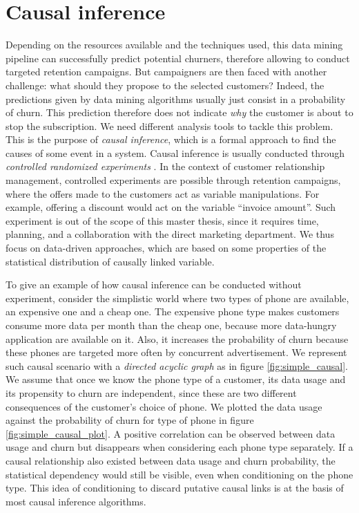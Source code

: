 \section{Causal inference}

Depending on the resources available and the techniques used, this data mining
pipeline can successfully predict potential churners, therefore allowing to
conduct targeted retention campaigns. But campaigners are then faced with
another challenge: what should they propose to the selected customers? Indeed,
the predictions given by data mining algorithms usually just consist in a
probability of churn. This prediction therefore does not indicate \emph{why} the
customer is about to stop the subscription. We need different analysis tools to
tackle this problem. This is the purpose of \emph{causal inference}, which is a
formal approach to find the causes of some event in a system. Causal inference
is usually conducted through \emph{controlled randomized experiments}
\parencite{fisher1937design}. In the context of customer relationship
management, controlled experiments are possible through retention campaigns,
where the offers made to the customers act as variable manipulations. For
example, offering a discount would act on the variable ``invoice amount''. Such
experiment is out of the scope of this master thesis, since it requires time,
planning, and a collaboration with the direct marketing department. We thus
focus on data-driven approaches, which are based on some properties of the
statistical distribution of causally linked variable.

To give an example of how causal inference can be conducted without experiment,
consider the simplistic world where two types of phone are available, an
expensive one and a cheap one. The expensive phone type makes customers consume
more data per month than the cheap one, because more data-hungry application are
available on it. Also, it increases the probability of churn because these
phones are targeted more often by concurrent advertisement. We represent such
causal scenario with a \emph{directed acyclic graph} as in figure
\ref{fig:simple_causal}. We assume that once we know the phone type of a
customer, its data usage and its propensity to churn are independent, since
these are two different consequences of the customer's choice of phone. We
plotted the data usage against the probability of churn for type of phone in
figure \ref{fig:simple_causal_plot}. A positive correlation can be observed
between data usage and churn but disappears when considering each phone type
separately. If a causal relationship also existed between data usage and churn
probability, the statistical dependency would still be visible, even when
conditioning on the phone type. This idea of conditioning to discard putative
causal links is at the basis of most causal inference algorithms.

